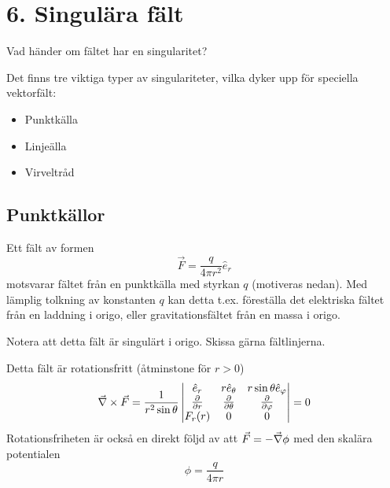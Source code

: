 \documentclass[%
oneside,                 %
final,                   %
10pt]{article}
\newenvironment{warning_mdfboxadmon}[1][]{
\begin{warning_mdfboxmdframed}[frametitle=#1]
}
{
\end{warning_mdfboxmdframed}
}
\begin{document}
\section*{6. Singulära fält}


\begin{warning_mdfboxadmon}[Fråga]
Vad händer om fältet har en singularitet?
\end{warning_mdfboxadmon} %



Det finns tre viktiga typer av singulariteter, vilka dyker upp för speciella vektorfält:

\begin{itemize}
\item Punktkälla 

\item Linjeälla 

\item Virveltråd
\end{itemize}

\noindent
\subsection*{Punktkällor}

Ett fält av formen 
\begin{equation}
  \vec{F} = \frac{q}{4 \pi r^2}\hat{e}_{r}
\end{equation}
motsvarar fältet från en punktkälla med styrkan $q$ (motiveras nedan). Med lämplig tolkning av konstanten $q$ kan detta t.ex. föreställa det elektriska fältet från en laddning i origo, eller gravitationsfältet från en massa i origo.  


\begin{warning_mdfboxadmon}[Kommentar]
Notera att detta fält är singulärt i origo. Skissa gärna fältlinjerna.
\end{warning_mdfboxadmon} %



Detta fält är rotationsfritt (åtminstone för $r>0$)
\begin{equation}
\vec{\nabla}\times\vec F = \frac{1}{r^2\sin\theta}
\begin{vmatrix}
\hat{e}_r&r\hat{e}_\theta&r\sin\theta\hat{e}_\varphi \\ 
\frac{\partial}{\partial r}& \frac{\partial}{\partial \theta}& \frac{\partial}{\partial \varphi} \\ 
F_r(r)&0&0
\end{vmatrix}=0
\end{equation}
Rotationsfriheten är också en direkt följd av att $\vec F = - \vec{\nabla} \phi$ med den skalära potentialen 
\begin{equation}
\phi=\frac{q}{4\pi r}
\end{equation}
\end{document}
